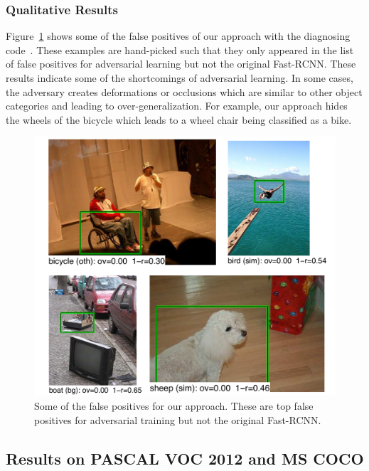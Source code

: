 \subsubsection{Qualitative Results}
\vspace{-0.05in}
Figure~\ref{fig:exp_fp} shows some of the false positives of our approach with the diagnosing code~\cite{hoiem12}. These examples are hand-picked such that they only appeared in the list of false positives for adversarial learning but not the original Fast-RCNN. These results indicate some of the shortcomings of adversarial learning. In some cases, the adversary creates deformations or occlusions which are similar to other object categories and leading to over-generalization. For example, our approach hides the wheels of the bicycle which leads to a wheel chair being classified as a bike. 




\begin{figure}
    \centering
    \includegraphics[width=0.95\linewidth]{fp_images.pdf}
    \vspace{-0.1in}
    \caption{Some of the false positives for our approach. These are top false positives for adversarial training but not the original Fast-RCNN.}\label{fig:exp_fp}
    \vspace{-0.15in}
\end{figure}



\subsection{Results on PASCAL VOC 2012 and MS COCO}

